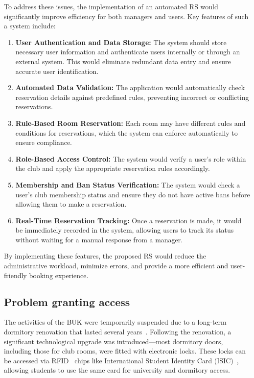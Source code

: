 To address these issues, the implementation of an automated RS would significantly improve efficiency for both managers and users. Key features of such a system include:
\begin{enumerate}
	\item \textbf{User Authentication and Data Storage:} The system should store necessary user information and authenticate users internally or through an external system. This would eliminate redundant data entry and ensure accurate user identification.
	\item \textbf{Automated Data Validation:} The application would automatically check reservation details against predefined rules, preventing incorrect or conflicting reservations.
	\item \textbf{Rule-Based Room Reservation:} Each room may have different rules and conditions for reservations, which the system can enforce automatically to ensure compliance.
	\item \textbf{Role-Based Access Control:} The system would verify a user’s role within the club and apply the appropriate reservation rules accordingly.
	\item \textbf{Membership and Ban Status Verification:} The system would check a user’s club membership status and ensure they do not have active bans before allowing them to make a reservation.
	\item \textbf{Real-Time Reservation Tracking:} Once a reservation is made, it would be immediately recorded in the system, allowing users to track its status without waiting for a manual response from a manager.
\end{enumerate}

By implementing these features, the proposed RS would reduce the administrative workload, minimize errors, and provide a more efficient and user-friendly booking experience.

\subsection{Problem granting access}

The activities of the BUK were temporarily suspended due to a long-term dormitory renovation that lasted several years~\cite{SUZBubenecReconstruction}. Following the renovation, a significant technological upgrade was introduced—most dormitory doors, including those for club rooms, were fitted with electronic locks. These locks can be accessed via RFID~\cite{RFID} chips  like International Student Identity Card (ISIC)~\cite{ISIC}, allowing students to use the same card for university and dormitory access.

